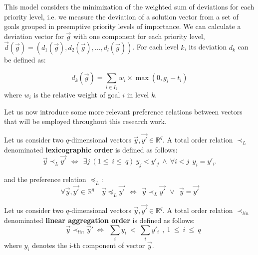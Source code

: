 This model considers the minimization of the weighted sum of deviations for each priority level, i.e. we measure the deviation of a solution vector from a set of goals grouped in preemptive priority levels of importance. We can calculate a deviation vector for $\vec g$ with one component for each priority level, $\vec{d}(\vec{g}) = (d_1(\vec{g}), d_2(\vec{g}),..., d_l(\vec{g}))$. For each level $k$, its deviation $d_k$ can be defined as:

\begin{equation}\label{eq:deviation-lex}
   d_k(\vec{g}) = \sum_{i\in I_k} w_{i} \times \max(0, g_{i} - t_{i})  
\end{equation}
where $w_i$ is the relative weight of goal $i$ in level $k$.

Let us now introduce some more relevant preference relations between vectors that will be employed throughout this research work.

\begin{defi}\label{chapMultiObjAlg:def:lexorder}
Let us consider two $q$-dimensional vectors $\vec y, \vec{y'} \in \mathbb{R}^q $. A total order relation $\prec_{L}$ denominated \textbf{lexicographic order} is defined as follows: 
\begin{equation}\label{chapMultiObjAlg:eq:lexorder}
 \vec{y} \prec_{L} \vec{y'} \ \ \Leftrightarrow \ \ \exists j \ (1\leq~i\leq~q) \ y_j < y'_j \ \land \ \forall i < j \ \ y_i = y'_i. 
\end{equation}
\end{defi}
and the preference relation $\preceq_{L}$: 
\begin{equation}
\forall \vec y,  \vec{y'} \in \mathbb{R}^q \quad \vec y \preceq_{L} \vec{y'} \ \ \Leftrightarrow \ \ 
\vec y \prec_{L} \vec{y'} \ \ \lor \ \ \vec y = \vec{y'}
\end{equation}

\begin{defi}\label{chapMultiObjAlg:def:linorder}
Let us consider two $q$-dimensional vectors $\vec y, \vec{y'} \in \mathbb{R}^q $. A total order relation $\prec_{lin}$ denominated \textbf{linear aggregation order} is defined as follows: 
\begin{equation}\label{chapMultiObjAlg:eq:linorder} \quad 
 \vec y \prec_{lin} \vec y' \ 
\Leftrightarrow \ \  
\sum_{i}{y_i} \ < \
\sum_{i}{y'_i} \ \ ,\ 1~\leq~i~\leq~q
\end{equation}
where $y_i$ denotes the i-th component of vector $\vec y$. 
\end{defi}

